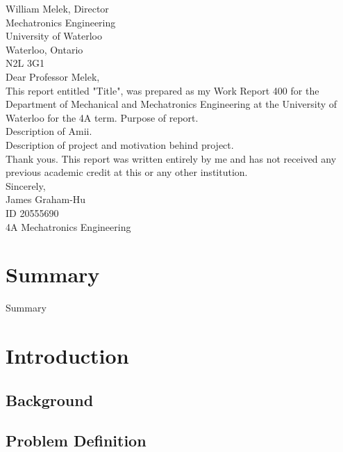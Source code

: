 \documentclass[letterpaper,12pt]{article}
\begin{document}
William Melek, Director\\
Mechatronics Engineering\\
University of Waterloo\\
Waterloo, Ontario\\
N2L 3G1\\

Dear Professor Melek,\\

This report entitled "Title", was prepared as my Work Report 400 for the Department of Mechanical and Mechatronics Engineering at the University of Waterloo for the 4A term. Purpose of report.\\

Description of Amii.\\

Description of project and motivation behind project.\\


Thank yous.
This report was written entirely by  me and has not received any previous academic credit at this or any other institution.\\

Sincerely,\\

James Graham-Hu\\
ID 20555690\\
4A Mechatronics Engineering



\pagebreak
\tableofcontents
\setcounter{page}{1}
\pagebreak
\listoffigures
\pagebreak
\listoftables
\pagebreak


\section{Summary}
Summary
\pagebreak
\section{Introduction}

\subsection{Background}

\subsection{Problem Definition}
\end{document}
